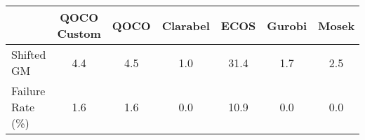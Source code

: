 \begin{tabular}{lcccccc}
  \hline
    & \textbf{QOCO Custom}   & \textbf{QOCO} & \textbf{Clarabel} & \textbf{ECOS} & \textbf{Gurobi} & \textbf{Mosek} \\ \hline
  Shifted GM & 4.4 & 4.5 & 1.0 & 31.4 & 1.7 & 2.5 \\ 
  Failure Rate (\%) & 1.6 & 1.6 & 0.0 & 10.9 & 0.0 & 0.0 \\ \hline 
\end{tabular}

